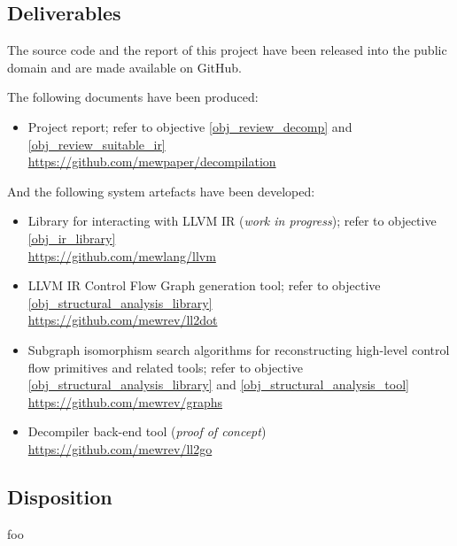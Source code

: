 \documentclass[12pt, a4paper]{article}
\begin{document}

\subsection{Deliverables}

The source code and the report of this project have been released into the public domain \cite{cc0} and are made available on GitHub.

The following documents have been produced:
\begin{itemize}
	\item Project report; refer to objective \ref{obj_review_decomp} and \ref{obj_review_suitable_ir} \\ \url{https://github.com/mewpaper/decompilation}
\end{itemize}

And the following system artefacts have been developed:
\begin{itemize}
	\item Library for interacting with LLVM IR (\textit{work in progress}); refer to objective \ref{obj_ir_library} \\ \url{https://github.com/mewlang/llvm}
	\item LLVM IR Control Flow Graph generation tool; refer to objective \ref{obj_structural_analysis_library} \\ \url{https://github.com/mewrev/ll2dot}
	\item Subgraph isomorphism search algorithms for reconstructing high-level control flow primitives and related tools; refer to objective \ref{obj_structural_analysis_library} and \ref{obj_structural_analysis_tool} \\ \url{https://github.com/mewrev/graphs}
	\item Decompiler back-end tool (\textit{proof of concept}) \\ \url{https://github.com/mewrev/ll2go}
\end{itemize}


\subsection{Disposition}

foo

\pagebreak

\end{document}
